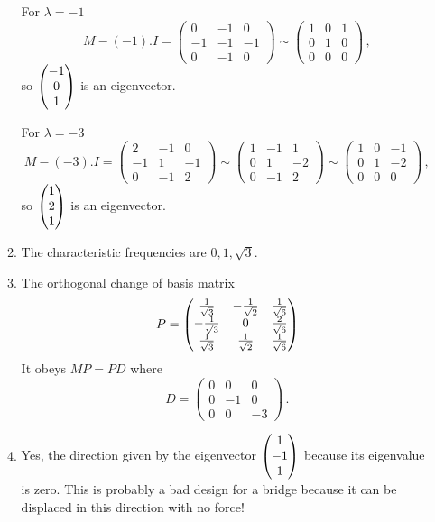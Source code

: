 \begin{enumerate}
\begin{enumerate}
For $\lambda=-1$
$$
M-(-1).I=\begin{pmatrix}0&-1&0\\-1&-1&-1\\0&-1&0\end{pmatrix}\sim\begin{pmatrix}1&0&1\\0&1&0\\0&0&0\end{pmatrix}
\, ,
$$
so $\begin{pmatrix} -1\\0\\1 \end{pmatrix}$ is an eigenvector.

For $\lambda=-3$
$$
M-(-3).I=\begin{pmatrix}2&-1&0\\-1&1&-1\\0&-1&2\end{pmatrix}\sim\begin{pmatrix}1&-1&1\\0&1&-2\\0&-1&2\end{pmatrix}
\sim\begin{pmatrix}1&0&-1\\0&1&-2\\0&0&0\end{pmatrix}\, ,
$$
so $\begin{pmatrix} 1\\2\\1 \end{pmatrix}$ is an eigenvector.

\item The characteristic frequencies are $0,1,\sqrt{3}$.
\item The orthogonal change of basis matrix 
$$
P=\begin{pmatrix}
\frac1{\sqrt{3}}&-\frac1{\sqrt{2}}&\frac{1}{\sqrt{6}}\\
-\frac1{\sqrt{3}}&\mc 0&\frac{2}{\sqrt{6}}\\
\frac1{\sqrt{3}}&\frac1{\sqrt{2}}&\frac{1}{\sqrt{6}}
\end{pmatrix}
$$
It obeys $MP=PD$ where
$$
D=\begin{pmatrix}0&0&0\\0&-1&0\\0&0&-3\end{pmatrix}\, .
$$
\item Yes, the direction given by the eigenvector $\begin{pmatrix} 1\\-1\\1 \end{pmatrix}$ because its eigenvalue is zero. This is probably a bad design for a bridge because it can be displaced in this direction with no force!
\end{enumerate}


\end{enumerate}
